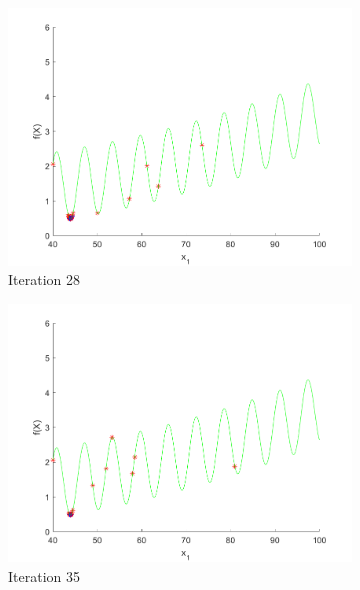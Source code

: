 \begin{figure}
\begin{subfigure}[b]{0.4\textwidth}
   \includegraphics[width=\textwidth]{img/smpl/grwnk1dshft/loa-iter-28}
   \caption{Iteration 28}
   \label{fig:i2-iter-4}
 \end{subfigure}
 \begin{subfigure}[b]{0.4\textwidth}
   \includegraphics[width=\textwidth]{img/smpl/grwnk1dshft/loa-iter-35}
   \caption{Iteration 35}
   \label{fig:i2-iter-5}
 \end{subfigure}
 \begin{subfigure}[b]{0.4\textwidth}

\end{subfigure}
\end{figure}
